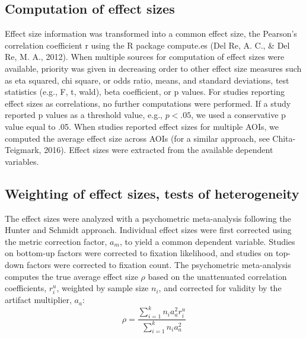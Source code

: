 \documentclass{article}
\begin{document}
\subsection{Computation of effect sizes}

Effect size information was transformed into a common effect size, the Pearson’s correlation coefficient r using the R package compute.es (Del Re, A. C., \& Del Re, M. A., 2012). When multiple sources for computation of effect sizes were available, priority was given in decreasing order to other effect size measures such as eta squared, chi square, or odds ratio, means, and standard deviations, test statistics (e.g., F, t, wald), beta coefficient, or p values. For studies reporting effect sizes as correlations, no further computations were performed. If a study reported p values as a threshold value, e.g., $p < .05$, we used a conservative p value equal to .05. When studies reported effect sizes for multiple AOIs, we computed the average effect size across AOIs (for a similar approach, see Chita-Teigmark, 2016). Effect sizes were extracted from the available dependent variables. 


\subsection{Weighting of effect sizes, tests of heterogeneity}

The effect sizes were analyzed with a psychometric meta-analysis following the Hunter and Schmidt approach. Individual effect sizes were first corrected using the metric correction factor, $a_m$, to yield a common dependent variable. Studies on bottom-up factors were corrected to fixation likelihood, and studies on top-down factors were corrected to fixation count. The psychometric meta-analysis computes the true average effect size $\rho$ based on the unattenuated correlation coefficients, $r_i^u$, weighted by sample size $n_i$, and corrected for validity by the artifact multiplier, $a_a$: 
%
\begin{equation}
\label{eq:psychometric_rho}
\rho = \frac{\sum_{i=1}^k n_i a_a^2 r_i^u}{\sum_{i=1}^k n_i a_a^2}
\end{equation}
\end{document}
